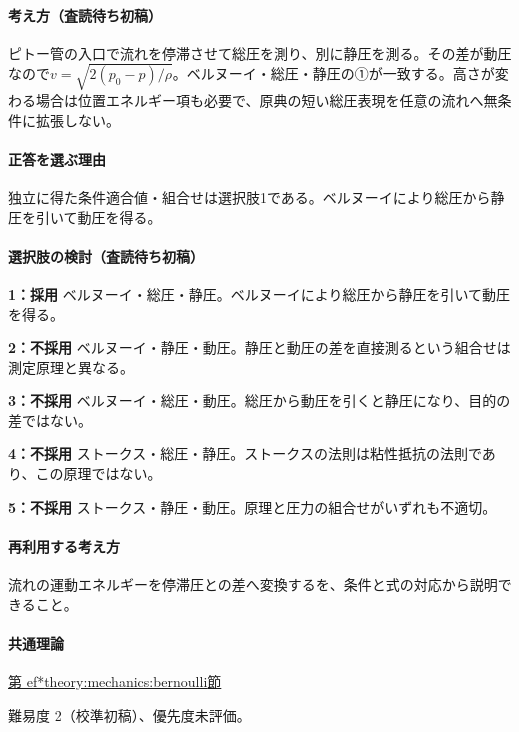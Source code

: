 \paragraph{考え方（査読待ち初稿）} ピトー管の入口で流れを停滞させて総圧を測り、別に静圧を測る。その差が動圧なので\(v=\sqrt{2(p_0-p)/\rho}\)。ベルヌーイ・総圧・静圧の①が一致する。高さが変わる場合は位置エネルギー項も必要で、原典の短い総圧表現を任意の流れへ無条件に拡張しない。

\paragraph{正答を選ぶ理由} 独立に得た条件適合値・組合せは選択肢1である。ベルヌーイにより総圧から静圧を引いて動圧を得る。

\paragraph{選択肢の検討（査読待ち初稿）}

\noindent\textbf{1：採用} ベルヌーイ・総圧・静圧。ベルヌーイにより総圧から静圧を引いて動圧を得る。\par

\noindent\textbf{2：不採用} ベルヌーイ・静圧・動圧。静圧と動圧の差を直接測るという組合せは測定原理と異なる。\par

\noindent\textbf{3：不採用} ベルヌーイ・総圧・動圧。総圧から動圧を引くと静圧になり、目的の差ではない。\par

\noindent\textbf{4：不採用} ストークス・総圧・静圧。ストークスの法則は粘性抵抗の法則であり、この原理ではない。\par

\noindent\textbf{5：不採用} ストークス・静圧・動圧。原理と圧力の組合せがいずれも不適切。\par

\paragraph{再利用する考え方} 流れの運動エネルギーを停滞圧との差へ変換するを、条件と式の対応から説明できること。

\paragraph{共通理論} \hyperref[theory:mechanics:bernoulli]{第
ef*{theory:mechanics:bernoulli}節}

\par 難易度 2（校準初稿）、優先度未評価。

